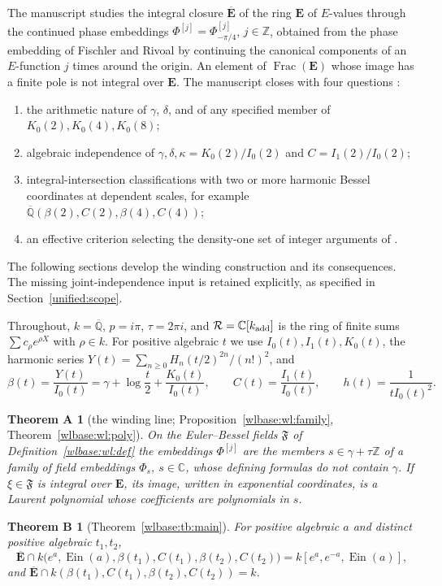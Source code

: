 \documentclass[11pt,a4paper]{article}
\newtheorem*{thmA}{Theorem A}
\newtheorem*{thmB}{Theorem B}
\theoremstyle{definition}\newtheorem{definition}[theorem]{Definition}
\theoremstyle{remark}\newtheorem{remark}[theorem]{Remark}
\newcommand{\Qb}{\overline{\mathbb Q}}
\newcommand{\E}{\mathbf E}\newcommand{\Ebar}{\overline{\mathbf E}}
\newcommand{\cR}{\mathcal R}\newcommand{\cM}{\mathcal M}
\newcommand{\Ein}{\operatorname{Ein}}
\newcommand{\F}{\mathfrak F}\newcommand{\FF}{\mathbb F}
\newcommand{\C}{\mathbb C}\newcommand{\Z}{\mathbb Z}
\DeclareMathOperator{\Frac}{Frac}\DeclareMathOperator{\ord}{ord}
\begin{document}
The manuscript \cite{EB} studies the integral closure $\Ebar$ of the ring $\E$
of $E$-values through the continued phase embeddings
$\Phi^{[j]}=\Phi^{[j]}_{-\pi/4}$, $j\in\Z$, obtained from the phase embedding
of Fischler and Rivoal \cite{FR} by continuing the canonical components of an
$E$-function $j$ times around the origin. An element of $\Frac(\E)$ whose
image has a finite pole is not integral over $\E$. The manuscript closes with
four questions \cite[\S``Scope'']{EB}:
\begin{enumerate}
\item[(Q1)] the arithmetic nature of $\gamma$, $\delta$, and of any specified
member of $K_0(2),K_0(4),K_0(8)$;
\item[(Q2)] algebraic independence of $\gamma,\delta,\kappa=K_0(2)/I_0(2)$ and
$C=I_1(2)/I_0(2)$;
\item[(Q3)] integral-intersection classifications with two or more harmonic
Bessel coordinates at dependent scales, for example
$\Qb(\beta(2),C(2),\beta(4),C(4))$;
\item[(Q4)] an effective criterion selecting the density-one set of integer
arguments of \cite[Theorem~jden:density]{EB}.
\end{enumerate}
The following sections develop the winding construction and its consequences.
The missing joint-independence input is retained explicitly, as specified in
Section~\ref{unified:scope}.

Throughout, $k=\Qb$, $p=i\pi$, $\tau=2\pi i$, and $\cR=\C[k_{\rm add}]$ is the
ring of finite sums $\sum c_\rho e^{\rho X}$ with $\rho\in k$. For positive
algebraic $t$ we use $I_0(t),I_1(t),K_0(t)$, the harmonic series
$Y(t)=\sum_{n\ge0}H_n(t/2)^{2n}/(n!)^2$, and
\[
 \beta(t)=\frac{Y(t)}{I_0(t)}=\gamma+\log\frac t2+\frac{K_0(t)}{I_0(t)},\qquad
 C(t)=\frac{I_1(t)}{I_0(t)},\qquad h(t)=\frac1{tI_0(t)^2}.
\]

\begin{thmA}[the winding line; Proposition~\ref{wlbase:wl:family}, Theorem~\ref{wlbase:wl:poly}]
On the Euler--Bessel fields $\F$ of Definition~\ref{wlbase:wl:def} the embeddings
$\Phi^{[j]}$ are the members $s\in\gamma+\tau\Z$ of a family of field
embeddings $\Phi_s$, $s\in\C$, whose defining formulas do not contain
$\gamma$. If $\xi\in\F$ is integral over $\E$, its image, written in
exponential coordinates, is a Laurent polynomial whose coefficients are
polynomials in $s$.
\end{thmA}

\begin{thmB}[Theorem~\ref{wlbase:tb:main}]
For positive algebraic $a$ and distinct positive algebraic $t_1,t_2$,
\[
 \Ebar\cap k\bigl(e^a,\Ein(a),\beta(t_1),C(t_1),\beta(t_2),C(t_2)\bigr)
 =k[e^a,e^{-a},\Ein(a)],
\]
and $\Ebar\cap k(\beta(t_1),C(t_1),\beta(t_2),C(t_2))=k$.
\end{thmB}
\end{document}
